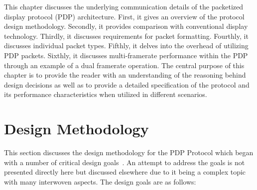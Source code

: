 \label{chap:pdp_protocol}

This chapter discusses the underlying communication details of the packetized display protocol (PDP) architecture. First, it gives an overview of the protocol design methodology. Secondly, it provides comparison with conventional display technology. Thirdly, it discusses requirements for packet formatting. Fourthly, it discusses individual packet types. Fifthly, it delves into the overhead of utilizing PDP packets. Sixthly, it discusses multi-framerate performance within the PDP through an example of a dual framerate operation. The central purpose of this chapter is to provide the reader with an understanding of the reasoning behind design decisions as well as to provide a detailed specification of the protocol and its performance characteristics when utilized in different scenarios.

\section{Design Methodology}
    \label{sec:design_methodology}
    This section discusses the design methodology for the PDP Protocol which began with a number of critical design goals~\cite{LandwehrEtAl2019}. An attempt to address the goals is not presented directly here but discussed  elsewhere due to it being a complex topic with many interwoven aspects. The design goals are as follows:

